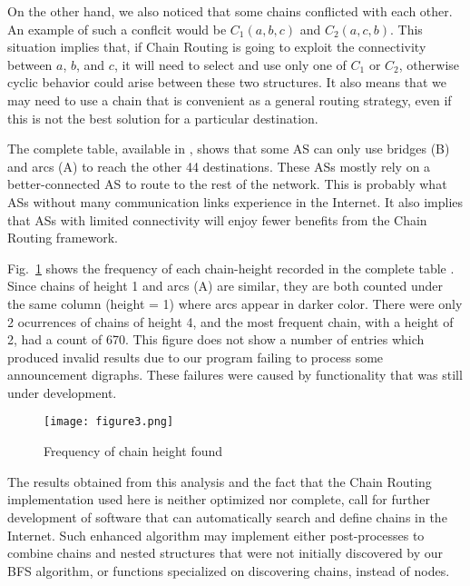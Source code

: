 \documentclass[5p,twocolumn]{elsarticle}
\begin{document}
On the other hand, we also noticed that some chains conflicted with each other. An example of such a conflcit would be $C_1(a, b, c)$ and $C_2(a, c, b)$. This situation implies that, if Chain Routing is going to exploit the connectivity between $a$, $b$, and $c$, it will need to select and use only one of $C_1$ or $C_2$, otherwise cyclic behavior could arise between these two structures. It also means that we may need to use a chain that is convenient as a general routing strategy, even if this is not the best solution for a particular destination.

The complete table, available in \cite{Arjona-Villicana2010a}, shows that some AS can only use bridges (B) and arcs (A) to reach the other 44 destinations. These ASs mostly rely on a better-connected AS to route to the rest of the network. This is probably what ASs without many communication links experience in the Internet. It also implies that ASs with limited connectivity will enjoy fewer benefits from the Chain Routing framework.

Fig.\ \ref{fig:FreqofHeight}  shows the frequency of each chain-height recorded in the complete table \cite{Arjona-Villicana2010a}. Since chains of height 1 and arcs (A) are similar, they are both counted under the same column (height = 1) where arcs appear in darker color. There were only 2 ocurrences of chains of height 4, and the most frequent chain, with a height of 2, had a count of 670. This figure does not show a number of entries which produced invalid results due to our program failing to process some announcement digraphs. These failures were caused by functionality that was still under development.

\begin{figure}[t]
	\centering
		\texttt{[image: figure3.png]}
	\caption{Frequency of chain height found}
	\label{fig:FreqofHeight}
\end{figure}

The results obtained from this analysis and the fact that the Chain Routing implementation used here is neither optimized nor complete, call for further development of software that can automatically search and define chains in the Internet. Such enhanced algorithm may implement either post-processes to combine chains and nested structures that were not initially discovered by our BFS algorithm, or functions specialized on discovering chains, instead of nodes.
\end{document}
